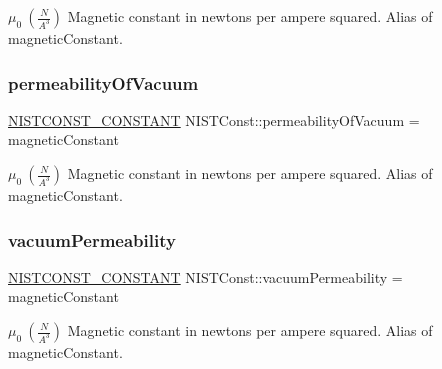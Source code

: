 $\mu_0 \ (\frac{N}{A^3})$ Magnetic constant in newtons per ampere squared. Alias of magnetic\+Constant. \mbox{\label{group___n_i_s_t_const-_magnetic_constant_gaac945c334102b3ce3ee774ea18051a42}} 
\subsubsection{\texorpdfstring{permeability\+Of\+Vacuum}{permeabilityOfVacuum}}
{\footnotesize\ttfamily \mbox{\hyperlink{group___n_i_s_t_const-_macros_ga2b0fc1d7452373f816175dd86ce26729}{N\+I\+S\+T\+C\+O\+N\+S\+T\+\_\+\+C\+O\+N\+S\+T\+A\+NT}} N\+I\+S\+T\+Const\+::permeability\+Of\+Vacuum = magnetic\+Constant}

$\mu_0 \ (\frac{N}{A^3})$ Magnetic constant in newtons per ampere squared. Alias of magnetic\+Constant. \mbox{\label{group___n_i_s_t_const-_magnetic_constant_ga25744097d980a807738dbea653616d78}} 
\subsubsection{\texorpdfstring{vacuum\+Permeability}{vacuumPermeability}}
{\footnotesize\ttfamily \mbox{\hyperlink{group___n_i_s_t_const-_macros_ga2b0fc1d7452373f816175dd86ce26729}{N\+I\+S\+T\+C\+O\+N\+S\+T\+\_\+\+C\+O\+N\+S\+T\+A\+NT}} N\+I\+S\+T\+Const\+::vacuum\+Permeability = magnetic\+Constant}

$\mu_0 \ (\frac{N}{A^3})$ Magnetic constant in newtons per ampere squared. Alias of magnetic\+Constant. 